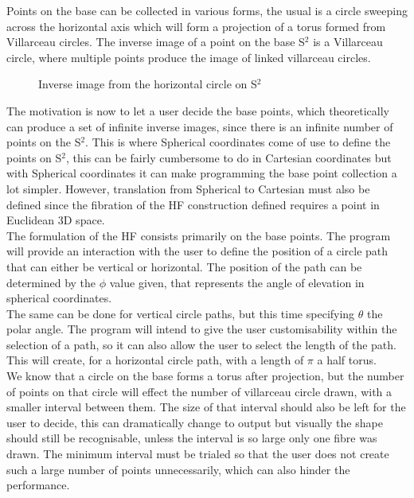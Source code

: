 \documentclass[12pt]{article} %
\begin{document}
\begin{flushleft}
Points on the base can be collected in various forms, the usual is a circle sweeping across the horizontal axis which will form a projection of a torus formed from Villarceau circles. The inverse image of a point on the base S$^{2}$ is a Villarceau circle, where multiple points produce the image of linked villarceau circles.\\
 \begin{figure}[H] %
\caption{Inverse image from the horizontal circle on S$^{2}$ \cite{Walczak:2009dg}}
\label{fig:speciation}
\end{figure}
The motivation is now to let a user decide the base points, which theoretically can produce a set of infinite inverse images, since there is an infinite number of points on the S$^{2}$. This is where Spherical coordinates come of use to define the points on S$^{2}$, this can be fairly cumbersome to do in Cartesian coordinates but with Spherical coordinates it can make programming the base point collection a lot simpler. However, translation from Spherical to Cartesian must also be defined since the fibration of the HF construction defined requires a point in Euclidean 3D space.\\
The formulation of the HF consists primarily on the base points. The program will provide an interaction with the user to define the position of a circle path that can either be vertical or horizontal. The position of the path can be determined by the $\phi$ value given, that represents the angle of elevation in spherical coordinates.\\
The same can be done for vertical circle paths, but this time specifying $\theta$ the polar angle. The program will intend to give the user customisability within the selection of a path, so it can also allow the user to select the length of the path. This will create, for a horizontal circle path, with a length of $\pi$ a half torus. \\
We know that a circle on the base forms a torus after projection, but the number of points on that circle will effect the number of villarceau circle drawn, with a smaller interval between them. The size of that interval should also be left for the user to decide, this can dramatically change to output but visually the shape should still be recognisable, unless the interval is so large only one fibre was drawn. The minimum interval must be trialed so that the user does not create such a large number of points unnecessarily, which can also hinder the performance.\\

\end{flushleft}
\end{document}
